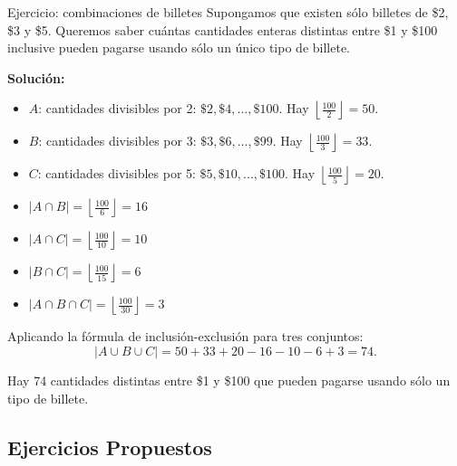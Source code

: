 \begin{exampleblock}{Ejercicio: combinaciones de billetes}
Supongamos que existen sólo billetes de \$2, \$3 y \$5. Queremos saber cuántas cantidades enteras distintas entre \$1 y \$100 inclusive pueden pagarse usando sólo un único tipo de billete.

\textbf{Solución:}
\begin{itemize}
  \item $A$: cantidades divisibles por 2: $\$2, \$4, ..., \$100$. Hay $\left\lfloor \frac{100}{2} \right\rfloor = 50$.
  \item $B$: cantidades divisibles por 3: $\$3, \$6, ..., \$99$. Hay $\left\lfloor \frac{100}{3} \right\rfloor = 33$.
  \item $C$: cantidades divisibles por 5: $\$5, \$10, ..., \$100$. Hay $\left\lfloor \frac{100}{5} \right\rfloor = 20$.

  \item $|A \cap B| = \left\lfloor \frac{100}{6} \right\rfloor = 16$
  \item $|A \cap C| = \left\lfloor \frac{100}{10} \right\rfloor = 10$
  \item $|B \cap C| = \left\lfloor \frac{100}{15} \right\rfloor = 6$
  \item $|A \cap B \cap C| = \left\lfloor \frac{100}{30} \right\rfloor = 3$
\end{itemize}

Aplicando la fórmula de inclusión-exclusión para tres conjuntos:
\[
|A \cup B \cup C| = 50 + 33 + 20 - 16 - 10 - 6 + 3 = 74.
\]

Hay 74 cantidades distintas entre \$1 y \$100 que pueden pagarse usando sólo un tipo de billete.
\end{exampleblock}

\subsection*{Ejercicios Propuestos}

